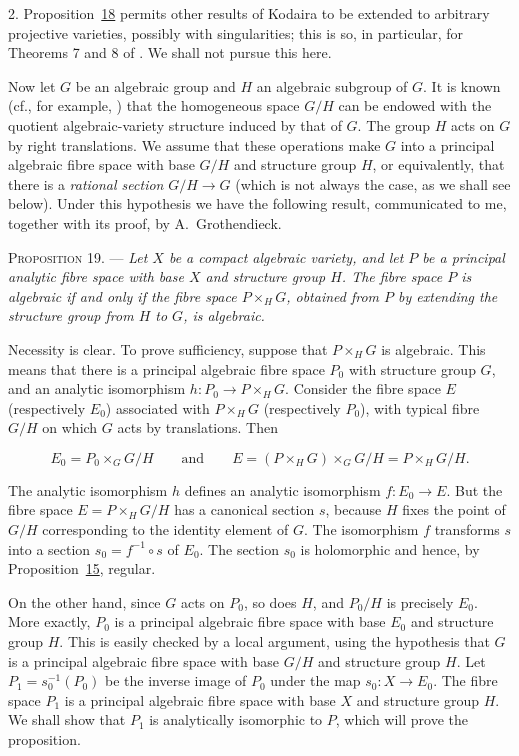 2. Proposition~\hyperref[gaga:prop:18]{18} permits other results of Kodaira to
be extended to arbitrary projective varieties, possibly with singularities;
this is so, in particular, for Theorems 7 and 8 of . We shall not pursue
this here.

Now let $G$ be an algebraic group and $H$ an algebraic subgroup of $G$. It is
known (cf., for example, ) that the homogeneous space $G/H$ can be endowed
with the quotient algebraic-variety structure induced by that of $G$. The group $H$
acts on $G$ by right translations. We assume that these operations make $G$
into a principal algebraic fibre space with base $G/H$ and structure group
$H$, or equivalently, that there is a \emph{rational section} $G/H\to G$
(which is not always the case, as we shall see below). Under this hypothesis
we have the following result, communicated to me, together with its proof, by
A.~Grothendieck.

\textsc{Proposition 19}. --- \emph{Let $X$ be a
compact algebraic variety, and let $P$ be a principal analytic fibre space
with base $X$ and structure group $H$. The fibre space $P$ is algebraic if and
only if the fibre space $P\times_HG$, obtained from $P$ by extending the
structure group from $H$ to $G$, is algebraic.}

Necessity is clear. To prove sufficiency, suppose that $P\times_HG$ is
algebraic. This means that there is a principal algebraic fibre space $P_0$
with structure group $G$, and an analytic isomorphism
$h:P_0\to P\times_HG$. Consider the fibre space $E$ (respectively $E_0$)
associated with $P\times_HG$ (respectively $P_0$), with typical fibre $G/H$
on which $G$ acts by translations. Then

\begin{equation*}
E_0=P_0\times_GG/H
\qquad\text{and}\qquad
E=(P\times_HG)\times_GG/H=P\times_HG/H.
\end{equation*}

The analytic isomorphism $h$ defines an analytic isomorphism $f:E_0\to E$.
But the fibre space $E=P\times_HG/H$ has a canonical section $s$, because
$H$ fixes the point of $G/H$ corresponding to the identity element of $G$.
The isomorphism $f$ transforms $s$ into a section
$s_0=f^{-1}\circ s$ of $E_0$. The section $s_0$ is holomorphic and hence,
by Proposition~\hyperref[gaga:prop:15]{15}, regular.

On the other hand, since $G$ acts on $P_0$, so does $H$, and $P_0/H$ is
precisely $E_0$. More exactly, $P_0$ is a principal algebraic fibre space with
base $E_0$ and structure group $H$. This is easily checked by a local
argument, using the hypothesis that $G$ is a principal algebraic fibre space
with base $G/H$ and structure group $H$. Let
$P_1=s_0^{-1}(P_0)$ be the inverse image of $P_0$ under the map
$s_0:X\to E_0$. The fibre space $P_1$ is a principal algebraic fibre space
with base $X$ and structure group $H$. We shall show that $P_1$ is
analytically isomorphic to $P$, which will prove the proposition.

